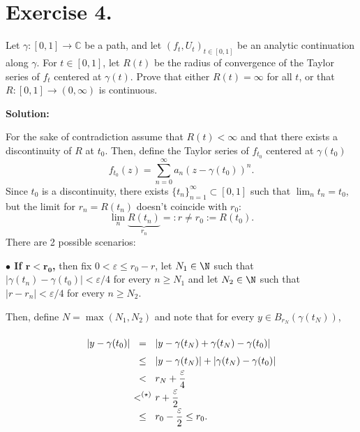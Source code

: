 \section*{Exercise 4.}

Let \(\gamma: [0, 1] \to \mathbb{C}\) be a path, and let \(( f_{t}, U_{t} )_{t \in [0, 1]}\) be an analytic continuation along \(\gamma\). For \(t \in [0, 1]\), let \(R(t)\) be the radius of convergence of the Taylor series of \(f_t\) centered at \(\gamma(t)\). Prove that either \(R(t) = \infty\) for all \(t\), or that \(R: [0, 1] \to (0, \infty)\) is continuous.

\textbf{Solution:}

For the sake of contradiction assume that $R(t) < \infty$ and that there exists a discontinuity of $R$ at $t_0$. Then, define the Taylor series of $f_{t_0}$ centered at $\gamma(t_0)$
\[ f_{t_0} ( z ) = \sum_{n = 0}^{\infty} a_n (z - \gamma(t_0))^n. \]
Since $t_0$ is a discontinuity, there exists $\{t_n\}_{n = 1}^{\infty} \subset [0,1]$ such that $\lim_n t_n = t_0$, but the limit for $r_n = R(t_n)$ doesn't coincide with $r_0$:
\[ \lim_n \underbrace{R(t_n)}_{r_n} =: r \neq r_0 := R(t_0). \]
There are 2 possible scenarios:

\textbf{$\boldsymbol{\bullet}$ If $\boldsymbol{r < r_0}$,} then fix $0 < \varepsilon \leq r_0 - r$, let $N_1 \in \N$ such that $|\gamma(t_n) - \gamma(t_0)| < \varepsilon/4$ for every $n \geq N_1$ and let $N_2 \in \N$ such that $|r-r_n| < \varepsilon/4$ for every $n \geq N_2$.

\begin{figure}[H]
    \centering
    
\end{figure} 

Then, define $ N = \max(N_1, N_2)$ and note that for every $y \in B_{r_N}(\gamma(t_N))$,

\[ \everymath{\displaystyle}
\arraycolsep=1.8pt\def\arraystretch{1.5}
\begin{array}{rcl}
    |y - \gamma(t_0)| & = & |y - \gamma(t_N) + \gamma(t_N) - \gamma(t_0)|\\
    & \leq & |y - \gamma(t_N)| + |\gamma(t_N) - \gamma(t_0)|\\
    & < & r_N + \frac{\varepsilon}{4}\\
    & <^{(\star)} & r + \frac{\varepsilon}{2}\\
    & \leq & r_0 - \frac{\varepsilon}{2} \leq r_0.
\end{array} \]

